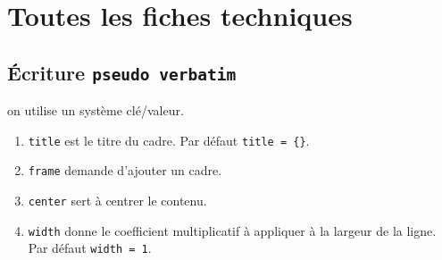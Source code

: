 \documentclass[12pt,a4paper]{article}
\theoremstyle{definition}
\begin{document}
\newpage
\section{Toutes les fiches techniques} \label{techincal-ids}









\subsection{Écriture \texttt{pseudo verbatim}}




\IDoption{} on utilise un système clé/valeur.
\begin{enumerate}
	\item \verb#title# est le titre du cadre.
	      Par défaut \verb#title = {}#.

	\item \verb#frame# demande d'ajouter un cadre.

	\item \verb#center# sert à centrer le contenu.

	\item \verb#width# donne le coefficient multiplicatif à appliquer à la largeur de la ligne.
	      Par défaut \verb#width = 1#.
\end{enumerate}
\end{document}
